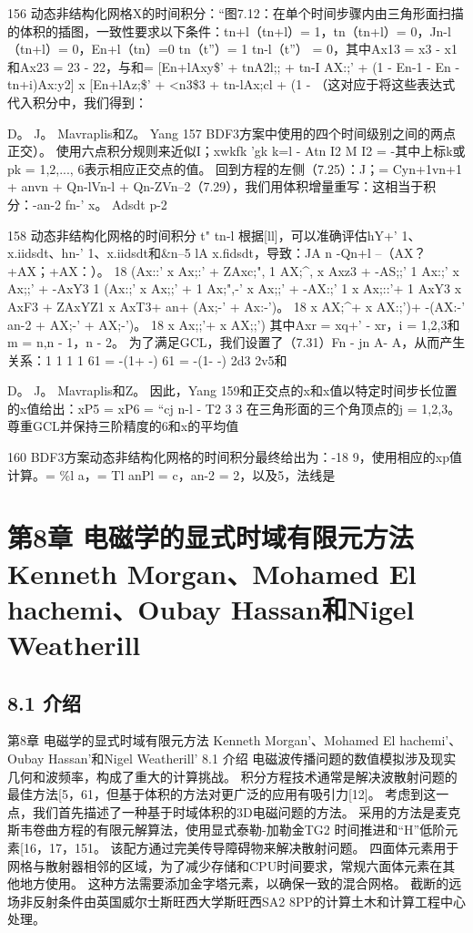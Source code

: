 \documentclass[UTF8,11pt,a4paper,openany,fontset=fandol]{ctexbook}
\begin{document}
156 动态非结构化网格X的时间积分：“图7.12：在单个时间步骤内由三角形面扫描的体积的插图，一致性要求以下条件：tn+l（tn+l）= 1，tn（tn+l）= 0，Jn-l（tn+l）= 0，En+l（tn）=0 tn（t”）= 1 tn-l（t”） = 0，其中Ax13 = x3 - x1和Ax23 = 23 - 22，与和= [En+lAxy\$' + tnA2l;; + tn-I AX:;' + (1 - En-1 - En - tn+i)Ax:y2] x [En+lAz;\$' + <n3\$3 + tn-lAx;cl + (1 - （这对应于将这些表达式代入积分中，我们得到：

D。 J。 Mavraplis和Z。 Yang 157 BDF3方案中使用的四个时间级别之间的两点正交）。 使用六点积分规则来近似I；xwkfk 'gk k=l - Atn I2 M I2 = -其中上标k或pk = 1,2,..., 6表示相应正交点的值。 回到方程的左侧（7.25）：J；= Cyn+1vn+1 + anvn + Qn-lVn-l + Qn-ZVn--2（7.29），我们用体积增量重写：这相当于积分：-an-2 fn-' x。 Adsdt p-2

158 动态非结构化网格的时间积分 t" tn-l 根据[ll]，可以准确评估hY+' 1、x.iidsdt、hn-' 1、x.iidsdt和\&n--5 lA x.fidsdt，导致：JA n -Qn+l --（AX？ +AX；+AX：）。 18 (Ax::' x Ax;:' + ZAxc;", 1 AX;\textasciicircum{}, x Axz3 + -AS;;' 1 Ax:;' x Ax;;' + -AxY3 1 (Ax:;' x Ax;;' + 1 Ax;",-' x Ax;;' + -AX:;' 1 x Ax;::'+ 1 AxY3 x AxF3 + ZAxYZ1 x AxT3+ an+ (Ax;-' + Ax:-')。 18 x AX;\textasciicircum{}+ x AX:;')+ -(AX:-' an-2 + AX;-' + AX;-')。 18 x Ax;;'+ x AX;;') 其中Axr = xq+' - xr，i = 1,2,3和m = n,n - 1，n - 2。 为了满足GCL，我们设置了（7.31）Fn - jn A- A，从而产生关系：1 1 1 1 61 = -(1+ -) 61 = -(1- -) 2d3 2v5和

D。 J。 Mavraplis和Z。 因此，Yang 159和正交点的x和x值以特定时间步长位置的x值给出：xP5 = xP6 = “cj n-l - T2 3 3 在三角形面的三个角顶点的j = 1,2,3。 尊重GCL并保持三阶精度的6和x的平均值

160 BDF3方案动态非结构化网格的时间积分最终给出为：-18 9，使用相应的xp值计算。= \%l a，= Tl anPl = c，an-2 = 2，以及5，法线是

\clearpage
\chapter{第8章 电磁学的显式时域有限元方法 Kenneth Morgan、Mohamed El hachemi、Oubay Hassan和Nigel Weatherill}
\section{8.1 介绍}
第8章 电磁学的显式时域有限元方法 Kenneth Morgan'、Mohamed El hachemi'、Oubay Hassan'和Nigel Weatherill' 8.1 介绍 电磁波传播问题的数值模拟涉及现实几何和波频率，构成了重大的计算挑战。 积分方程技术通常是解决波散射问题的最佳方法[5，61，但基于体积的方法对更广泛的应用有吸引力[12]。 考虑到这一点，我们首先描述了一种基于时域体积的3D电磁问题的方法。 采用的方法是麦克斯韦卷曲方程的有限元解算法，使用显式泰勒-加勒金TG2 时间推进和“H”低阶元素[16，17，151。 该配方通过完美传导障碍物来解决散射问题。 四面体元素用于网格与散射器相邻的区域，为了减少存储和CPU时间要求，常规六面体元素在其他地方使用。 这种方法需要添加金字塔元素，以确保一致的混合网格。 截断的远场非反射条件由英国威尔士斯旺西大学斯旺西SA2 8PP的计算土木和计算工程中心处理。
\end{document}
